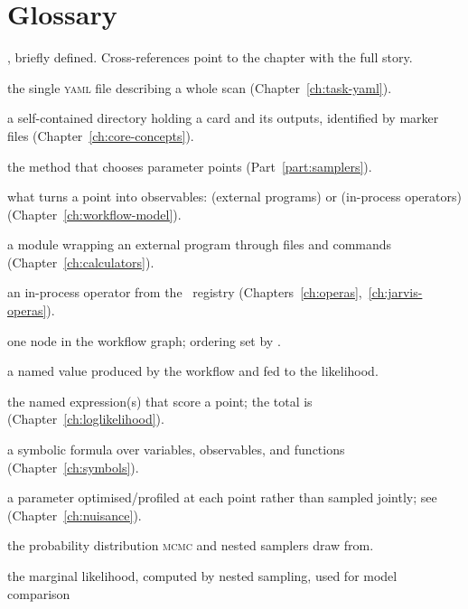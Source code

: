 \chapter{Glossary}
\label{app:glossary}

, briefly defined. Cross-references point to the
chapter with the full story.

\begin{description}[style=nextline, leftmargin=1.2em]
  \item[Task card] the single \textsc{yaml} file describing a whole scan
        (Chapter~\ref{ch:task-yaml}).
  \item[Standalone project] a self-contained directory holding a card and its outputs, identified
        by marker files (Chapter~\ref{ch:core-concepts}).
  \item[Sampler] the method that chooses parameter points (Part~\ref{part:samplers}).
  \item[Workflow backend] what turns a point into observables:  (external
        programs) or  (in-process operators) (Chapter~\ref{ch:workflow-model}).
  \item[Calculator] a module wrapping an external program through files and commands
        (Chapter~\ref{ch:calculators}).
  \item[Opera] an in-process operator from the \Operas\ registry
        (Chapters~\ref{ch:operas},~\ref{ch:jarvis-operas}).
  \item[Module] one node in the workflow graph; ordering set by .
  \item[Observable] a named value produced by the workflow and fed to the likelihood.
  \item[LogLikelihood] the named expression(s) that score a point; the total is 
        (Chapter~\ref{ch:loglikelihood}).
  \item[Expression] a symbolic formula over variables, observables, and functions
        (Chapter~\ref{ch:symbols}).
  \item[Nuisance parameter] a parameter optimised/profiled at each point rather than sampled
        jointly; see  (Chapter~\ref{ch:nuisance}).
  \item[Posterior] the probability distribution \textsc{mcmc} and nested samplers draw from.
  \item[Evidence] the marginal likelihood, computed by nested sampling, used for model comparison

\end{description}
